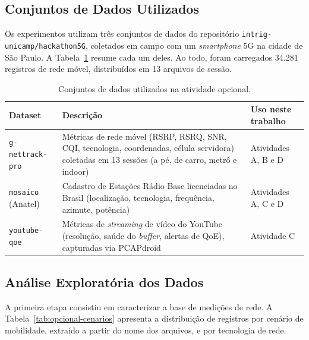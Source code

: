 \documentclass[11pt,a4paper]{article}
\begin{document}
\subsection{Conjuntos de Dados Utilizados}
\label{sec:opcional-dados}

Os experimentos utilizam três conjuntos de dados do repositório \texttt{intrig-unicamp/hackathon5G}, coletados em campo com um \emph{smartphone} 5G na cidade de São Paulo. A Tabela~\ref{tab:opcional-datasets} resume cada um deles. Ao todo, foram carregados 34.281 registros de rede móvel, distribuídos em 13 arquivos de sessão.

\begin{table}[H]
\centering
\caption{Conjuntos de dados utilizados na atividade opcional.}
\label{tab:opcional-datasets}
\begin{tabular}{lp{6.2cm}p{4.8cm}}
\toprule
\textbf{Dataset} & \textbf{Descrição} & \textbf{Uso neste trabalho} \\
\midrule
\texttt{g-nettrack-pro} & Métricas de rede móvel (RSRP, RSRQ, SNR, CQI, tecnologia, coordenadas, célula servidora) coletadas em 13 sessões (a pé, de carro, metrô e indoor) & Atividades A, B e D \\
\texttt{mosaico} (Anatel) & Cadastro de Estações Rádio Base licenciadas no Brasil (localização, tecnologia, frequência, azimute, potência) & Atividades A, C e D \\
\texttt{youtube-qoe} & Métricas de \emph{streaming} de vídeo do YouTube (resolução, saúde do \emph{buffer}, alertas de QoE), capturadas via PCAPdroid & Atividade C \\
\bottomrule
\end{tabular}
\end{table}

\subsection{Análise Exploratória dos Dados}
\label{sec:opcional-exploracao-dados}

A primeira etapa consistiu em caracterizar a base de medições de rede. A Tabela~\ref{tab:opcional-cenarios} apresenta a distribuição de registros por cenário de mobilidade, extraído a partir do nome dos arquivos, e por tecnologia de rede.
\end{document}
